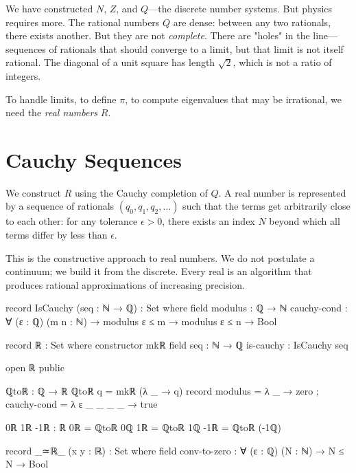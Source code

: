 \documentclass[11pt,a4paper]{book}
\def\mathbb#1{#1}%
\begin{document}
We have constructed $\mathbb{N}$, $\mathbb{Z}$, and $\mathbb{Q}$—the discrete number systems. 
But physics requires more. The rational numbers $\mathbb{Q}$ are dense: between any two 
rationals, there exists another. But they are not \emph{complete}. There are "holes" in the 
line—sequences of rationals that should converge to a limit, but that limit is not itself 
rational. The diagonal of a unit square has length $\sqrt{2}$, which is not a ratio of integers.

To handle limits, to define $\pi$, to compute eigenvalues that may be irrational, we need 
the \emph{real numbers} $\mathbb{R}$.

\section{Cauchy Sequences}

We construct $\mathbb{R}$ using the Cauchy completion of $\mathbb{Q}$. A real number is 
represented by a sequence of rationals $(q_0, q_1, q_2, \ldots)$ such that the terms get 
arbitrarily close to each other: for any tolerance $\epsilon > 0$, there exists an index 
$N$ beyond which all terms differ by less than $\epsilon$.

This is the constructive approach to real numbers. We do not postulate a continuum; we 
build it from the discrete. Every real is an algorithm that produces rational approximations 
of increasing precision.

\begin{code}
record IsCauchy (seq : ℕ → ℚ) : Set where
  field
    modulus : ℚ → ℕ
    cauchy-cond : ∀ (ε : ℚ) (m n : ℕ) → 
                  modulus ε ≤ m → modulus ε ≤ n → Bool

record ℝ : Set where
  constructor mkℝ
  field
    seq : ℕ → ℚ
    is-cauchy : IsCauchy seq

open ℝ public

ℚtoℝ : ℚ → ℝ
ℚtoℝ q = mkℝ (λ _ → q) record 
  { modulus = λ _ → zero
  ; cauchy-cond = λ ε _ _ _ _ → true
  }

0ℝ 1ℝ -1ℝ : ℝ
0ℝ  = ℚtoℝ 0ℚ
1ℝ  = ℚtoℝ 1ℚ
-1ℝ = ℚtoℝ (-1ℚ)

record _≃ℝ_ (x y : ℝ) : Set where
  field
    conv-to-zero : ∀ (ε : ℚ) (N : ℕ) → N ≤ N → Bool
\end{code}
\end{document}
